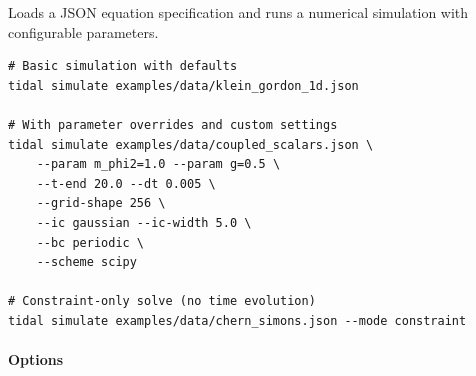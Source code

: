 Loads a JSON equation specification and runs a numerical simulation with configurable parameters.

\begin{lstlisting}[style=bash]
# Basic simulation with defaults
tidal simulate examples/data/klein_gordon_1d.json

# With parameter overrides and custom settings
tidal simulate examples/data/coupled_scalars.json \
    --param m_phi2=1.0 --param g=0.5 \
    --t-end 20.0 --dt 0.005 \
    --grid-shape 256 \
    --ic gaussian --ic-width 5.0 \
    --bc periodic \
    --scheme scipy

# Constraint-only solve (no time evolution)
tidal simulate examples/data/chern_simons.json --mode constraint
\end{lstlisting}

\paragraph{Options}

